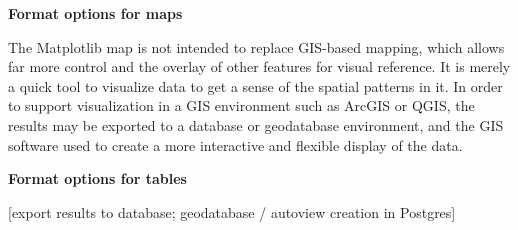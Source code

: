 {\bf Format options for maps}

The Matplotlib map is not intended to replace GIS-based mapping, which
allows far more control and the overlay of other features for visual
reference.  It is merely a quick tool to visualize data to get a sense
of the spatial patterns in it.  In order to support visualization in a
GIS environment such as ArcGIS or QGIS, the results may be exported to
a database or geodatabase environment, and the GIS software used to
create a more interactive and flexible display of the data.


{\bf Format options for tables}


[export results to database; geodatabase / autoview creation in
Postgres]



% 
% 
% 
% 
% 
% 
% 

